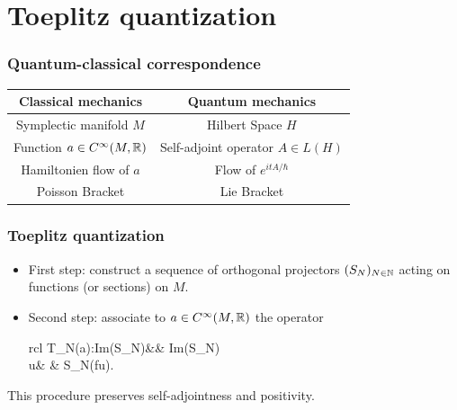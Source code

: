 \documentclass[mathserif]{beamer}
\newcommand{\spline}{\hline}
\begin{document}
      \section{Toeplitz quantization}
      \begin{frame}
        \frametitle{Quantum-classical correspondence}
\begin{center}
	\begin{tabular}{|c|c|}
		\spline
	    Classical mechanics & Quantum mechanics\\
		\spline
		Symplectic manifold $M$ & Hilbert Space $H$\\ 
		\spline 
		Function $a\in C^{\infty}(M,\mathbb{R})$ & Self-adjoint
                                                   operator $A\in L(H)$\\
		\spline
                Hamiltonien flow of $a$ & Flow of $e^{itA/\hbar}$\\
		\spline
		Poisson Bracket & Lie Bracket\\
		\spline
	\end{tabular}\end{center}\vspace{0em}
	\begin{itemize}
	\end{itemize}
\end{frame}

\begin{frame}
  \frametitle{Toeplitz quantization}
  \begin{itemize}
  \item {\color{myorange} First step}: construct a sequence of
    orthogonal projectors $(S_N)_{N\in \mathbb{N}}$ acting on functions (or sections) on $M$.
    \item {\color{myorange} Second step}: associate to $a\in
      C^{\infty}(M,\mathbb{R})$ the operator
      \begin{center}
\begin{array}{rcl}
 		T_N(a):Im(S_N)&\to & Im(S_N)\\
		u& \mapsto& S_N(fu\uncover).
 		\end{array}
\end{center}
\end{itemize}

\vfill

This procedure preserves self-adjointness and {\color{myorange}
  positivity}.

\vfill

\end{frame}
\end{document}
